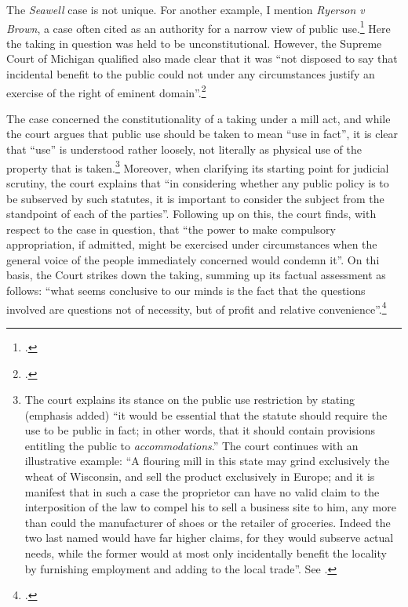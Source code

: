 The {\it Seawell} case is not unique. For another example, I mention {\it Ryerson v Brown}, a case often cited as an authority for a narrow view of public use.\footcite{ryerson77} Here the taking in question was held to be unconstitutional. However, the Supreme Court of Michigan qualified also made clear that it was ``not disposed to say that incidental benefit to the public could not under any circumstances justify an exercise of the right of eminent domain''.\footcite[337]{ryerson77}

The case concerned the constitutionality of a taking under a mill act, and while the court argues that public use should be taken to mean ``use in fact'', it is clear that ``use'' is understood rather loosely, not literally as physical use of the property that is taken.\footnote{The court explains its stance on the public use restriction by stating (emphasis added) ``it would be essential that the statute should require the use to be public in fact; in other words, that it should contain provisions entitling the public to {\it accommodations}.'' The court continues with an illustrative example: ``A flouring mill in this state may grind exclusively the wheat of Wisconsin, and sell the product exclusively in Europe; and it is manifest that in such a case the proprietor can have no valid claim to the interposition of the law to compel his  to sell a business site to him, any more than could the manufacturer of shoes or the retailer of groceries. Indeed the two last named would have far higher claims, for they would subserve actual needs, while the former would at most only incidentally benefit the locality by furnishing employment and adding to the local trade''. See \cite[336]{ryerson77}.} Moreover, when clarifying its starting point for judicial scrutiny, the court explains that ``in considering whether any public policy is to be subserved by such statutes, it is important to consider the subject from the standpoint of each of the parties''. Following up on this, the court finds, with respect to the case in question, that ``the power to make compulsory appropriation, if admitted, might be exercised under circumstances when the general voice of the people immediately concerned would condemn it''. On thi basis, the Court strikes down the taking, summing up its factual assessment as follows: ``what seems conclusive to our minds is the fact that the questions involved are questions not of necessity, but of profit and relative convenience''.\footcite[336]{ryerson77}

